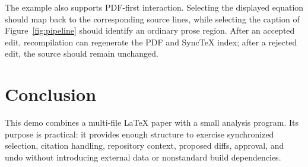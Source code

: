 \documentclass[11pt]{article}
\begin{document}
The example also supports PDF-first interaction.  Selecting the displayed
equation should map back to the corresponding source lines, while selecting the
caption of Figure~\ref{fig:pipeline} should identify an ordinary prose region.
After an accepted edit, recompilation can regenerate the PDF and SyncTeX index;
after a rejected edit, the source should remain unchanged.

\section{Conclusion}
This demo combines a multi-file LaTeX paper with a small analysis program.  Its
purpose is practical: it provides enough structure to exercise synchronized
selection, citation handling, repository context, proposed diffs, approval, and
undo without introducing external data or nonstandard build dependencies.



\end{document}

